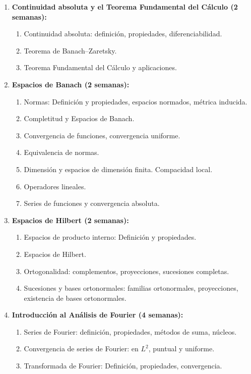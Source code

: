 \begin{refsection}
\begin{enumerate}
\item \textbf{Continuidad absoluta y el Teorema Fundamental del Cálculo (2 semanas):} 

\begin{enumerate}
    \item Continuidad absoluta: definición, propiedades, diferenciabilidad.
    \item Teorema de Banach--Zaretsky.
    \item Teorema Fundamental del Cálculo y aplicaciones.
\end{enumerate}



\item \textbf{Espacios de Banach (2 semanas):} 
\begin{enumerate}
    \item Normas: Definición y propiedades, espacios normados, métrica inducida.
    \item Completitud y Espacios de Banach.
    \item Convergencia de funciones, convergencia uniforme.
    \item Equivalencia de normas.
    \item Dimensión y espacios de dimensión finita. Compacidad local.
    \item Operadores lineales.
    \item Series de funciones y convergencia absoluta.
\end{enumerate}

\item \textbf{Espacios de Hilbert (2 semanas):} 
\begin{enumerate}
    \item Espacios de producto interno: Definición y propiedades.
    \item Espacios de Hilbert.
    \item Ortogonalidad: complementos, proyecciones, sucesiones completas.
    \item Sucesiones y bases ortonormales: familias ortonormales, proyecciones, existencia de bases ortonormales.
\end{enumerate}



\item \textbf{Introducción al Análisis de Fourier (4 semanas):} 
\begin{enumerate}
    \item Series de Fourier: definición, propiedades, métodos de suma, núcleos.
    \item Convergencia de series de Fourier: en $L^2$, puntual y uniforme.
    \item Transformada de Fourier: Definición, propiedades, convergencia.
\end{enumerate}




\end{enumerate}
\end{refsection}
